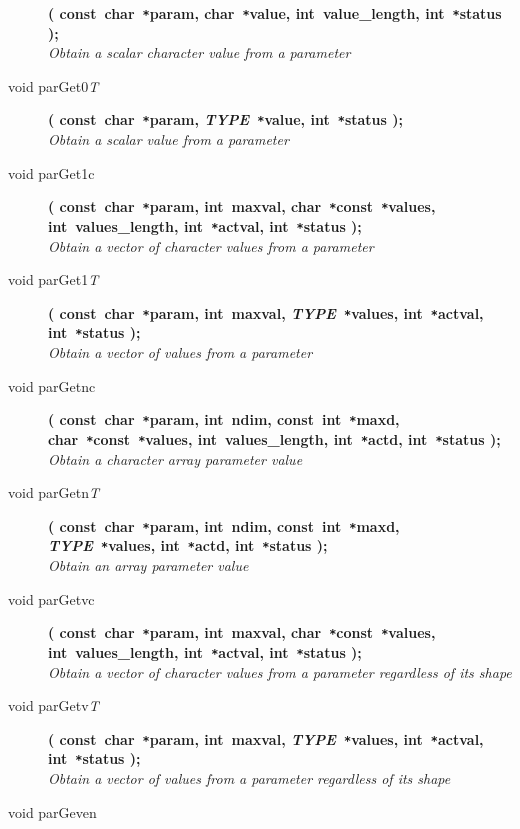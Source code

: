\documentclass[twoside,11pt,nolof]{starlink}
\begin{document}
\begin{flushleft}
\begin{description}
\textbf{( const~char~\texttt{*}param, char~\texttt{*}value,
          int~value\_length, int~\texttt{*}status );}\\
\textit{Obtain a scalar character value from a parameter}
\item[void parGet0\textit{T}]
\textbf{( const~char~\texttt{*}param,
          \textit{TYPE}~\texttt{*}value, int~\texttt{*}status );}\\
\textit{Obtain a scalar value from a parameter}
\item[void parGet1c]
\textbf{( const~char~\texttt{*}param, int~maxval,
               char~\texttt{*}const~\texttt{*}values, int~values\_length,
               int~\texttt{*}actval, int~\texttt{*}status );} \\
\textit{Obtain a vector of character values from a parameter}
\item[void parGet1\textit{T}]
\textbf{( const~char~\texttt{*}param, int~maxval,
               \textit{TYPE}~\texttt{*}values, int~\texttt{*}actval,
               int~\texttt{*}status );} \\
\textit{Obtain a vector of values from a parameter}
\item[void parGetnc]
\textbf{( const~char~\texttt{*}param, int~ndim, const~int~\texttt{*}maxd,
               char~\texttt{*}const~\texttt{*}values, int~values\_length,
               int~\texttt{*}actd, int~\texttt{*}status );} \\
\textit{Obtain a character array parameter value}
\item[void parGetn\textit{T}]
\textbf{( const~char~\texttt{*}param, int~ndim, const~int~\texttt{*}maxd,
               \textit{TYPE}~\texttt{*}values, int~\texttt{*}actd,
               int~\texttt{*}status );} \\
\textit{Obtain an array parameter value}
\item[void parGetvc]
\textbf{( const~char~\texttt{*}param, int~maxval,
               char~\texttt{*}const~\texttt{*}values, int~values\_length,
               int~\texttt{*}actval, int~\texttt{*}status );} \\
\textit{Obtain a vector of character values from a parameter regardless of its
               shape}
\item[void parGetv\textit{T}]
\textbf{( const~char~\texttt{*}param, int~maxval,
               \textit{TYPE}~\texttt{*}values, int~\texttt{*}actval,
               int~\texttt{*}status );} \\
\textit{Obtain a vector of values from a parameter regardless of its shape}
\item[void parGeven]

\end{description}
\end{flushleft}
\end{document}
